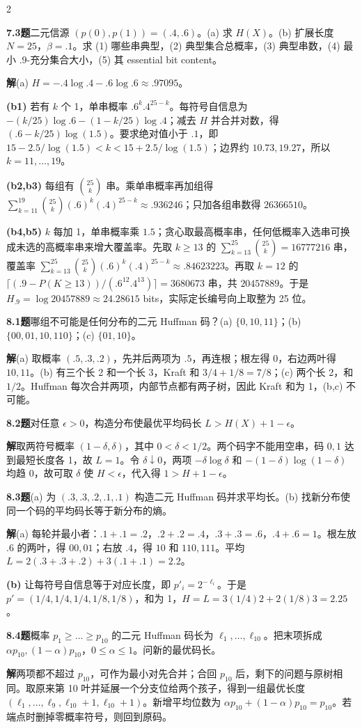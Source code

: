 \documentclass[a4paper]{article}
\newcommand{\bodyformat}{\fontsize{9.6}{13}\selectfont}
\newcommand{\cols}{2}
\newcommand{\bodyformat}{\fontsize{6.65}{7.8}\selectfont}
\newcommand{\cols}{4}
\newcommand{\topic}[1]{\par\addvspace{2.6pt}{\color{ink}\bfseries #1}\par\nobreak}
\newcommand{\problem}[2]{\par\addvspace{1.4pt}\textcolor{ink}{\textbf{#1}}\enspace\textbf{题}\enspace #2\par\nobreak}
\newcommand{\solve}{\noindent\textbf{解}\enspace}
\newcommand{\parta}[1]{\par\noindent\textbf{(#1)}\enspace}
\begin{document}
  \begin{multicols}{\cols}
  \bodyformat\raggedright
\fi
\problem{7.3}{二元信源 $(p(0),p(1))=(.4,.6)$。(a) 求 $H(X)$。(b) 扩展长度 $N=25$，$\beta=.1$。求 (1) 哪些串典型，(2) 典型集合总概率，(3) 典型串数，(4) 最小 $.9$-充分集合大小，(5) 其 essential bit content。}
\solve (a) $H=-.4\log .4-.6\log .6\approx.97095$。
\parta{b1} 若有 $k$ 个 1，单串概率 $.6^k .4^{25-k}$。每符号自信息为 $-(k/25)\log .6-(1-k/25)\log .4$；减去 $H$ 并合并对数，得 $(.6-k/25)\log(1.5)$。要求绝对值小于 $.1$，即 $15-2.5/\log(1.5)<k<15+2.5/\log(1.5)$；边界约 $10.73,19.27$，所以 $k=11,\ldots,19$。
\parta{b2,b3} 每组有 $\binom{25}k$ 串。乘单串概率再加组得 $\sum_{k=11}^{19}\binom{25}k(.6)^k(.4)^{25-k}\approx.936246$；只加各组串数得 $26366510$。
\parta{b4,b5} $k$ 每加 1，单串概率乘 $1.5$；贪心取最高概率串，任何低概率入选串可换成未选的高概率串来增大覆盖率。先取 $k\ge13$ 的 $\sum_{k=13}^{25}\binom{25}k=16777216$ 串，覆盖率 $\sum_{k=13}^{25}\binom{25}k(.6)^k(.4)^{25-k}\approx.84623223$。再取 $k=12$ 的 $\lceil(.9-P(K\ge13))/(.6^{12}.4^{13})\rceil=3680673$ 串，共 $20457889$。于是 $H_{.9}=\log 20457889\approx24.28615$ bits，实际定长编号向上取整为 25 位。

\topic{Tut 8 · 二元 Huffman}
\problem{8.1}{哪组不可能是任何分布的二元 Huffman 码？(a) $\{0,10,11\}$；(b) $\{00,01,10,110\}$；(c) $\{01,10\}$。}
\solve (a) 取概率 $(.5,.3,.2)$，先并后两项为 $.5$，再连根；根左得 $0$，右边两叶得 $10,11$。(b) 有三个长 2 和一个长 3，Kraft 和 $3/4+1/8=7/8$；(c) 两个长 2，和 $1/2$。Huffman 每次合并两项，内部节点都有两子树，因此 Kraft 和为 1，(b,c) 不可能。
\problem{8.2}{对任意 $\epsilon>0$，构造分布使最优平均码长 $L>H(X)+1-\epsilon$。}
\solve 取两符号概率 $(1-\delta,\delta)$，其中 $0<\delta<1/2$。两个码字不能用空串，码 $0,1$ 达到最短长度各 1，故 $L=1$。令 $\delta\downarrow0$，两项 $-\delta\log\delta$ 和 $-(1-\delta)\log(1-\delta)$ 均趋 0，故可取 $\delta$ 使 $H<\epsilon$，代入得 $1>H+1-\epsilon$。
\problem{8.3}{(a) 为 $(.3,.3,.2,.1,.1)$ 构造二元 Huffman 码并求平均长。(b) 找新分布使同一个码的平均码长等于新分布的熵。}
\solve (a) 每轮并最小者：$.1+.1=.2$，$.2+.2=.4$，$.3+.3=.6$，$.4+.6=1$。根左放 $.6$ 的两叶，得 $00,01$；右放 $.4$，得 $10$ 和 $110,111$。平均 $L=2(.3+.3+.2)+3(.1+.1)=2.2$。
\parta{b} 让每符号自信息等于对应长度，即 $p'_i=2^{-\ell_i}$。于是 $p'=(1/4,1/4,1/4,1/8,1/8)$，和为 1，$H=L=3(1/4)2+2(1/8)3=2.25$。
\problem{8.4}{概率 $p_1\ge\dots\ge p_{10}$ 的二元 Huffman 码长为 $\ell_1,\ldots,\ell_{10}$。把末项拆成 $\alpha p_{10},(1-\alpha)p_{10}$，$0\le\alpha\le1$。问新的最优码长。}
\solve 两项都不超过 $p_{10}$，可作为最小对先合并；合回 $p_{10}$ 后，剩下的问题与原树相同。取原来第 10 叶并延展一个分支位给两个孩子，得到一组最优长度 $(\ell_1,\ldots,\ell_9,\ell_{10}+1,\ell_{10}+1)$。新增平均位数为 $\alpha p_{10}+(1-\alpha)p_{10}=p_{10}$。若端点时删掉零概率符号，则回到原码。


\end{multicols}
\end{document}
